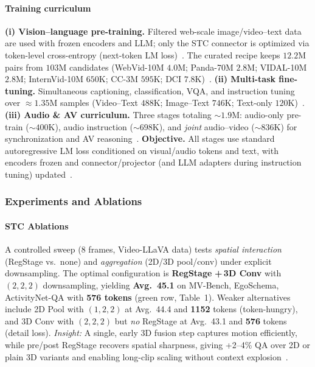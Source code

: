 \begin{enrichment}
\begin{enrichment}
        \paragraph{Training curriculum}
        \textbf{(i) Vision–language pre-training.} Filtered web-scale image/video–text data are used with frozen encoders and LLM; only the STC connector is optimized via token-level cross-entropy (next-token LM loss)~\cite[Sec.~3.1.1]{cheng2024_videollama2}. The curated recipe keeps \(12.2\)M pairs from \(103\)M candidates (WebVid-10M \(4.0\)M; Panda-70M \(2.8\)M; VIDAL-10M \(2.8\)M; InternVid-10M \(650\)K; CC-3M \(595\)K; DCI \(7.8\)K)~\cite[Tab.~2]{cheng2024_videollama2}. 
        \textbf{(ii) Multi-task fine-tuning.} Simultaneous captioning, classification, VQA, and instruction tuning over \(\approx 1.35\)M samples (Video–Text \(488\)K; Image–Text \(746\)K; Text-only \(120\)K)~\cite[Sec.~3.1.2; Tab.~3]{cheng2024_videollama2}. 
        \textbf{(iii) Audio \& AV curriculum.} Three stages totaling \(\sim 1.9\)M: audio-only pre-train (\(\sim 400\)K), audio instruction (\(\sim 698\)K), and \emph{joint} audio–video (\(\sim 836\)K) for synchronization and AV reasoning~\cite[Sec.~3.2; Tab.~4]{cheng2024_videollama2}. 
        \textbf{Objective.} All stages use standard autoregressive LM loss conditioned on visual/audio tokens and text, with encoders frozen and connector/projector (and LLM adapters during instruction tuning) updated~\cite[Sec.~3]{cheng2024_videollama2}.
        
        \newpage
        
        \subsubsection{Experiments and Ablations}
        \label{subsubsec:chapter24_videollama2_expts}
        
        \paragraph{STC Ablations}
        A controlled sweep (8 frames, Video-LLaVA data) tests \emph{spatial interaction} (RegStage vs.\ none) and \emph{aggregation} (2D/3D pool/conv) under explicit downsampling. The optimal configuration is \textbf{RegStage\,\checkmark\,+\,3D Conv} with \((2,2,2)\) downsampling, yielding \textbf{Avg.\ 45.1} on MV\mbox{-}Bench, EgoSchema, ActivityNet\mbox{-}QA with \textbf{576 tokens} (green row, Table~1). Weaker alternatives include 2D Pool with \((1,2,2)\) at Avg.\ 44.4 and \textbf{1152} tokens (token\mbox{-}hungry), and 3D Conv with \((2,2,2)\) but \emph{no} RegStage at Avg.\ 43.1 and \textbf{576} tokens (detail loss). \textit{Insight:} A single, early 3D fusion step captures motion efficiently, while pre/post RegStage recovers spatial sharpness, giving +2--4\% QA over 2D or plain 3D variants and enabling long\mbox{-}clip scaling without context explosion~\cite[Tab.~1]{cheng2024_videollama2}.
        

\end{enrichment}
\end{enrichment}
